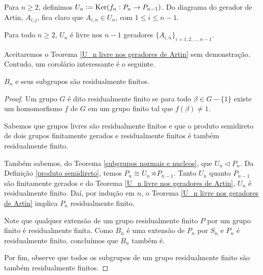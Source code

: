 	\par\vspace{0.3cm} Para $n\geq 2$, definimos $U_n\vcentcolon=\operatorname{Ker}(f_n: P_n\to P_{n-1})$. 
	Do diagrama do gerador de Artin, $A_{i,j}$, fica claro que $A_{i,n}\in U_n$, com $1\leq i\leq n-1$. 
	\begin{theorem}
	\label{U_n livre nos geradores de Artin}
		Para todo $n\geq 2$, $U_n$ é livre nos $n-1$ geradores $\{ A_{i,n} \}_{i=1,2,\dots,n-1}$.
	\end{theorem}
	Aceitaremos o Teorema \ref{U_n livre nos geradores de Artin} sem demonstração. 
	Contudo, um corolário interessante é o seguinte.
	\begin{corollary}
	\label{B_n residualmente finito}
		$B_n$ e seus subgrupos são residualmente finitos.
	\end{corollary}
	\begin{proof}
		Um grupo $G$ é dito residualmente finito se para todo $\beta\in G-\{1\}$ existe 
		um homomorfismo $f$ de $G$ em um grupo finito tal que $f(\beta)\neq 1$.
		
		\par\vspace{0.3cm} Sabemos que grupos livres são residualmente finitos e que o produto 
		semidireto de dois grupos finitamente gerados e residualmente finitos é também residualmente finito.
		
		\par\vspace{0.3cm} Também sabemos, do Teorema \ref{subgrupos normais e nucleos}, que
		$U_n\vartriangleleft P_n$. Da Definição \ref{produto semidireto}, temos 
		$P_n\cong U_n\rtimes P_{n-1}$. Tanto $U_n$ quanto $P_{n-1}$ são finitamente gerados e do 
		Teorema \ref{U_n livre nos geradores de Artin}, $U_n$ é residualmente finito. 
		Daí, por indução em $n$, o Teorema \ref{U_n livre nos geradores de Artin} implica 
		$P_n$ residualmente finito.
		
		\par\vspace{0.3cm} Note que qualquer extensão de um grupo residualmente finito $P$ por 
		um grupo finito é residualmente finita. Como $B_n$ é uma extensão de $P_n$ por $S_n$ e $P_n$ é
		residualmente finito, concluímos que $B_n$ também é.
		
		\par\vspace{0.3cm} Por fim, observe que todos os subgrupos de um grupo residualmente 
		finito são também residualmente finitos.	
	\end{proof}
